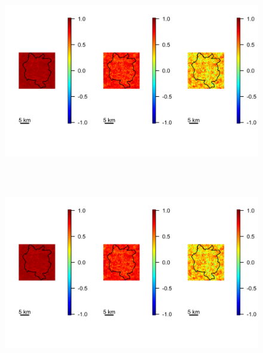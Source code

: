     \begin{figure}[H]
        \begin{center}
            \includegraphics[width = \linewidth, height = 80mm]{Autocorrelations in the Latent Field - Major 0.png}
        \end{center}
    \end{figure}

    \begin{figure}[H]
        \begin{center}
            \includegraphics[width = \linewidth, height = 80mm]{Autocorrelations in the Latent Field - Major 2.png}
        \end{center}
    \end{figure}


